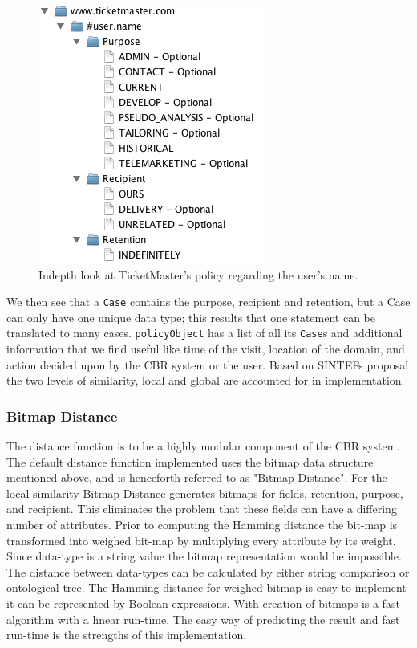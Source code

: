 \begin{figure}[htbp]
\begin{center}
\includegraphics{Implementation/p3p_fields}
\caption{Indepth look at TicketMaster's policy regarding the user's name.}
\label{p3pNameField}
\end{center}
\end{figure}


We then see that a \texttt{Case} contains the purpose, recipient and retention, but a Case can only have one unique data type; this results that one statement can be translated to many cases. \texttt{policyObject} has a list of all its \texttt{Case}s and additional information that we find useful like time of the visit, location of the domain, and action decided upon by the CBR system or the user. Based on SINTEFs proposal the two levels of similarity, local and global are accounted for in implementation. 

\subsubsection{Bitmap Distance}

The distance function is to be a highly modular component of the CBR system. The default distance function implemented uses the bitmap data structure mentioned above, and is henceforth referred to as "Bitmap Distance". For the local similarity Bitmap Distance generates bitmaps for fields, retention, purpose, and recipient. This eliminates the problem that these fields can have a differing number of attributes.  Prior to computing the Hamming distance the bit-map is transformed into weighed bit-map by multiplying every attribute by its weight. Since data-type is a string value the bitmap representation would be impossible. The distance between data-types can be calculated by either string comparison or ontological tree. The Hamming distance for weighed bitmap is easy to implement it can be represented by Boolean expressions. With creation of bitmaps is a fast algorithm with a linear run-time. The easy way of predicting the result and fast run-time is the strengths of this implementation.



